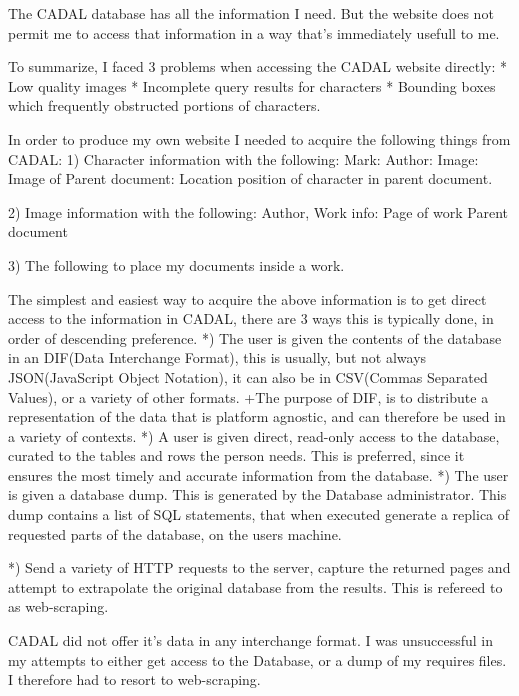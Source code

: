 The CADAL database has all the information I need.  But the website does not permit me to access that information in a way that's immediately usefull to me.

    To summarize, I faced 3 problems when accessing the CADAL website directly:
        *  Low quality images
        *  Incomplete query results for characters
        *  Bounding boxes which frequently obstructed portions of characters.
                   



    In order to produce my own website I needed to acquire the following things from CADAL:
        1)  Character information with the following:
            Mark:
            Author:
            Image:
            Image of Parent document:
            Location position of character in parent document.
        
        2)  Image information with the following:
            Author,
            Work info:
                Page of work
                Parent document
            
        3)    The following to place my documents inside a work.
                
            The simplest and easiest way to acquire the above information is to get direct access to the information in CADAL, there are 3 ways this is typically done, in order of descending preference.
            *)  The user is given the contents of the database in an DIF(Data Interchange Format), this is usually, but not always JSON(JavaScript Object Notation), it can also be in CSV(Commas Separated Values), or a variety of other formats.
                +The purpose of DIF, is to distribute a representation of the data that is platform agnostic, and can  therefore be used in a variety of contexts.
            *)  A user is given direct, read-only access to the database, curated to the tables and rows the person needs.  This is preferred, since it ensures the most timely and accurate information from the database.
            *)  The user is given a database dump.  This is generated by the Database administrator.  This dump contains a list of SQL statements, that when executed generate a replica of requested parts of the database, on the users machine.

            *)  Send a variety of HTTP requests to the server, capture the returned pages and attempt to extrapolate the original database from the results.  This is refereed to as web-scraping.
            
            CADAL did not offer it's data in any interchange format.  I was unsuccessful in my attempts to either get access to the Database, or a dump of my requires files.  I therefore had to resort to web-scraping.
            
